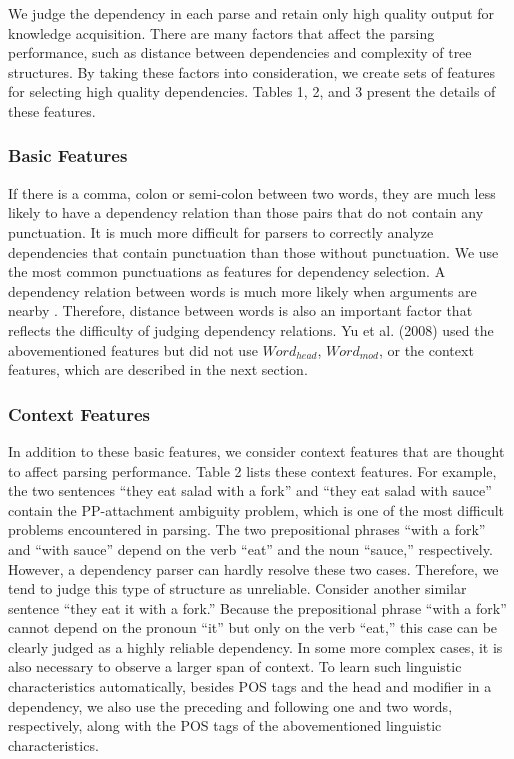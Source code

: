 \documentclass[english]{jnlp_1.4}
\begin{document}
We judge the dependency in each parse and retain only high quality output for knowledge acquisition. There are many factors that affect the parsing
performance, such as distance between dependencies and complexity of tree structures. By taking these
factors into consideration, we create sets of features for
selecting high quality dependencies. Tables 1, 2, and
3 present the details of these features.


\subsubsection{Basic Features}

If there is a comma, colon or semi-colon between two words, they are much less likely to have a dependency relation than those pairs that do not contain any punctuation. It is much more difficult for parsers to correctly analyze dependencies that contain punctuation than those without punctuation.
We use the most common punctuations as features for dependency selection. A dependency relation between words is much more likely when arguments are nearby \cite{McDonald:2007}. 
Therefore, distance between words is also an important factor that reflects
the difficulty of judging dependency relations. 
Yu et al. (2008) used the abovementioned features but did not use 
$\mathit{Word_{head}}$, $\mathit{Word_{mod}}$, or the context features, which are described in the next section.


\subsubsection{Context Features }

In addition to these basic features, we consider context features
that are thought to affect parsing performance. Table 2 lists
these context features.
For example, the two sentences ``they
eat salad with a fork'' and ``they eat salad with sauce'' contain the PP-attachment ambiguity
problem, which is one of the most difficult problems encountered in
parsing. The two prepositional phrases ``with a fork'' and ``with sauce''
depend on the verb ``eat'' and the noun ``sauce,'' respectively.
However, a dependency parser can hardly resolve these two cases.
Therefore, we tend to judge this type of structure as unreliable.
Consider another similar sentence ``they eat it
with a fork.'' Because the prepositional phrase ``with a fork'' cannot
depend on the pronoun ``it'' but only on the verb ``eat,'' this
case can be clearly judged as a highly reliable dependency. In some
more complex cases, it is also necessary to observe a larger span of
context. To learn such linguistic characteristics automatically, besides
POS tags and the head and modifier in a dependency, we also use the preceding and
following one and two words, respectively, along with the POS tags of the abovementioned linguistic characteristics.
\end{document}

